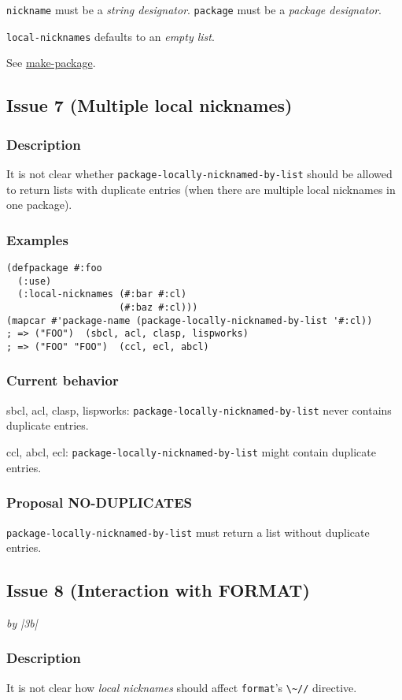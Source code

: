 \documentclass[11pt]{article}
\begin{document}
\texttt{nickname} must be a \emph{string designator}.
\texttt{package} must be a \emph{package designator}.

\texttt{local-nicknames} defaults to an \emph{empty list}.

See \hyperref[sec:org21b99a6]{make-package}.

\subsection{Issue 7 (Multiple local nicknames)}
\label{sec:orgbf27f8f}
\subsubsection{Description}
\label{sec:org4fd429e}
It is not clear whether \texttt{package-locally-nicknamed-by-list} should be allowed to return
lists with duplicate entries (when there are multiple local nicknames in one package).
\subsubsection{Examples}
\label{sec:org36b426c}
\begin{verbatim}
(defpackage #:foo
  (:use)
  (:local-nicknames (#:bar #:cl)
                    (#:baz #:cl)))
(mapcar #'package-name (package-locally-nicknamed-by-list '#:cl))
; => ("FOO")  (sbcl, acl, clasp, lispworks)
; => ("FOO" "FOO")  (ccl, ecl, abcl)
\end{verbatim}
\subsubsection{Current behavior}
\label{sec:org842ea6f}
sbcl, acl, clasp, lispworks:
  \texttt{package-locally-nicknamed-by-list} never contains duplicate entries.

ccl, abcl, ecl:
  \texttt{package-locally-nicknamed-by-list} might contain duplicate entries.
\subsubsection{Proposal NO-DUPLICATES}
\label{sec:orge0e68e8}
\texttt{package-locally-nicknamed-by-list} must return a list without duplicate entries.

\subsection{Issue 8 (Interaction with FORMAT)}
\label{sec:orgcf85241}
\emph{by |3b|}
\subsubsection{Description}
\label{sec:org7c69d91}
It is not clear how \emph{local nicknames} should affect \texttt{format}'s \texttt{\textbackslash{}\textasciitilde{}//} directive.
\end{document}
